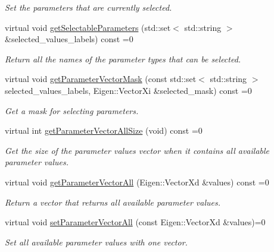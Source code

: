 \begin{DoxyCompactItemize}
\begin{DoxyCompactList}\small\item\em Set the parameters that are currently selected. \end{DoxyCompactList}\item 
virtual void \hyperlink{classDmpBbo_1_1Parameterizable_ac378b5f6e435af19251fb6537ba30ade}{get\+Selectable\+Parameters} (std\+::set$<$ std\+::string $>$ \&selected\+\_\+values\+\_\+labels) const =0
\begin{DoxyCompactList}\small\item\em Return all the names of the parameter types that can be selected. \end{DoxyCompactList}\item 
virtual void \hyperlink{classDmpBbo_1_1Parameterizable_ae7f6cbc5723ed4734ded5f2ba59bd366}{get\+Parameter\+Vector\+Mask} (const std\+::set$<$ std\+::string $>$ selected\+\_\+values\+\_\+labels, Eigen\+::\+Vector\+Xi \&selected\+\_\+mask) const =0
\begin{DoxyCompactList}\small\item\em Get a mask for selecting parameters. \end{DoxyCompactList}\item 
virtual int \hyperlink{classDmpBbo_1_1Parameterizable_ab89eda9a1c1ba010db81002975e6e52c}{get\+Parameter\+Vector\+All\+Size} (void) const =0
\begin{DoxyCompactList}\small\item\em Get the size of the parameter values vector when it contains all available parameter values. \end{DoxyCompactList}\item 
virtual void \hyperlink{classDmpBbo_1_1Parameterizable_addcd9c243e3d9e104c9a4513c81e3b5b}{get\+Parameter\+Vector\+All} (Eigen\+::\+Vector\+Xd \&values) const =0
\begin{DoxyCompactList}\small\item\em Return a vector that returns all available parameter values. \end{DoxyCompactList}\item 
virtual void \hyperlink{classDmpBbo_1_1Parameterizable_acef2ee975b497baf60b1f38da2b65f0d}{set\+Parameter\+Vector\+All} (const Eigen\+::\+Vector\+Xd \&values)=0
\begin{DoxyCompactList}\small\item\em Set all available parameter values with one vector. \end{DoxyCompactList}\item 

\end{DoxyCompactItemize}
